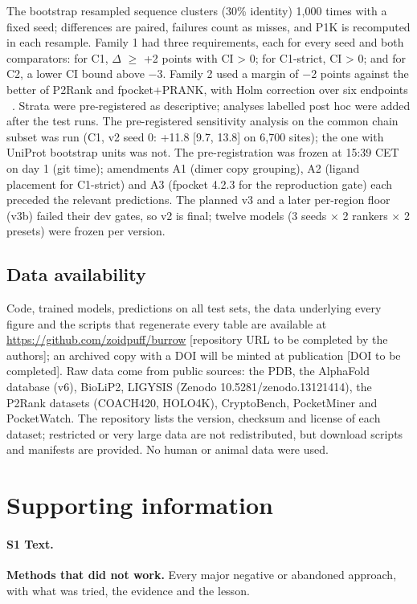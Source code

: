 \documentclass[10pt,letterpaper]{article}
\begin{document}
The bootstrap resampled sequence clusters (30\% identity) 1,000 times with a fixed seed; differences are paired, failures count as misses, and P1K is recomputed in each resample. Family 1 had three requirements, each for every seed and both comparators: for C1, $\Delta$ $\ge$ +2 points with CI \textgreater{} 0; for C1-strict, CI \textgreater{} 0; and for C2, a lower CI bound above $-$3. Family 2 used a margin of $-$2 points against the better of P2Rank and fpocket+PRANK, with Holm correction over six endpoints ~\cite{holm1979}. Strata were pre-registered as descriptive; analyses labelled post hoc were added after the test runs. The pre-registered sensitivity analysis on the common chain subset was run (C1, v2 seed 0: +11.8 [9.7, 13.8] on 6,700 sites); the one with UniProt bootstrap units was not. The pre-registration was frozen at 15:39 CET on day 1 (git time); amendments A1 (dimer copy grouping), A2 (ligand placement for C1-strict) and A3 (fpocket 4.2.3 for the reproduction gate) each preceded the relevant predictions. The planned v3 and a later per-region floor (v3b) failed their dev gates, so v2 is final; twelve models (3 seeds $\times$ 2 rankers $\times$ 2 presets) were frozen per version.

\subsection*{Data availability}

Code, trained models, predictions on all test sets, the data underlying every figure and the scripts that regenerate every table are available at \url{https://github.com/zoidpuff/burrow} [repository URL to be completed by the authors]; an archived copy with a DOI will be minted at publication [DOI to be completed]. Raw data come from public sources: the PDB, the AlphaFold database (v6), BioLiP2, LIGYSIS (Zenodo 10.5281/zenodo.13121414), the P2Rank datasets (COACH420, HOLO4K), CryptoBench, PocketMiner and PocketWatch. The repository lists the version, checksum and license of each dataset; restricted or very large data are not redistributed, but download scripts and manifests are provided. No human or animal data were used.

\section*{Supporting information}

\paragraph*{S1 Text.}
\label{S1_Text}
{\bf Methods that did not work.} Every major negative or abandoned approach, with what was tried, the evidence and the lesson.
\end{document}
